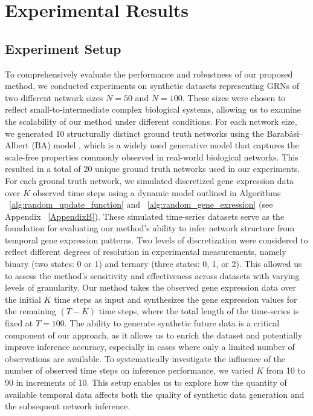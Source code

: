 \section{Experimental Results}
\subsection{Experiment Setup}
To comprehensively evaluate the performance and robustness of our proposed method, we conducted experiments on synthetic datasets representing GRNs of two different network sizes \(N = 50\) and \(N = 100\). These sizes were chosen to reflect small-to-intermediate complex biological systems, allowing us to examine the scalability of our method under different conditions.
For each network size, we generated 10 structurally distinct ground truth networks using the Barabási--Albert (BA) model \parencite{Barabasi2006}, which is a widely used generative model that captures the scale-free properties commonly observed in real-world biological networks. This resulted in a total of 20 unique ground truth networks used in our experiments.
For each ground truth network, we simulated discretized gene expression data over \(K\) observed time steps using a dynamic model outlined in Algorithms ~\ref{alg:random_update_function} and ~\ref{alg:random_gene_exression} (see Appendix ~\ref{AppendixB}). These simulated time-series datasets serve as the foundation for evaluating our method's ability to infer network structure from temporal gene expression patterns. Two levels of discretization were considered to reflect different degrees of resolution in experimental measurements, namely binary (two states: 0 or 1) and ternary (three states: 0, 1, or 2). This allowed us to assess the method's sensitivity and effectiveness across datasets with varying levels of granularity.
Our method takes the observed gene expression data over the initial \(K\) time steps as input and synthesizes the gene expression values for the remaining \((T - K)\) time steps, where the total length of the time-series is fixed at \(T = 100\). The ability to generate synthetic future data is a critical component of our approach, as it allows us to enrich the dataset and potentially improve inference accuracy, especially in cases where only a limited number of observations are available.
To systematically investigate the influence of the number of observed time steps on inference performance, we varied \(K\) from 10 to 90 in increments of 10. This setup enables us to explore how the quantity of available temporal data affects both the quality of synthetic data generation and the subsequent network inference.
